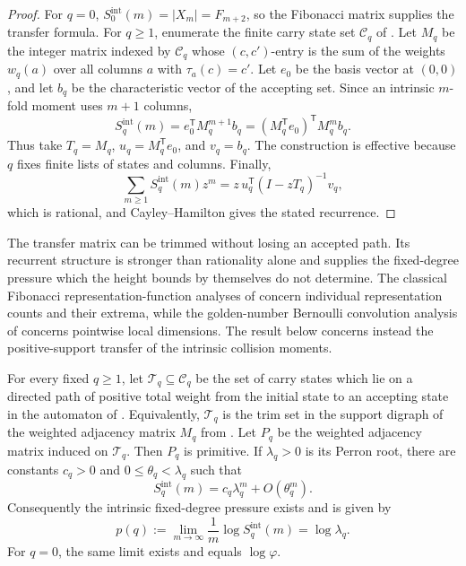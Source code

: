 \begin{proof}
For \(q=0\), \(S_0^{\mathrm{int}}(m)=|X_m|=F_{m+2}\), so the Fibonacci matrix
supplies the transfer formula.  For \(q\ge1\), enumerate the finite carry state
set \(\mathcal C_q\) of .  Let
\(M_q\) be the integer matrix indexed by \(\mathcal C_q\) whose \((c,c')\)-entry
is the sum of the weights \(w_q(a)\) over all columns \(a\) with
\(\tau_a(c)=c'\).  Let \(e_0\) be the basis vector at \((0,0)\), and let \(b_q\)
be the characteristic vector of the accepting set.  Since an intrinsic
\(m\)-fold moment uses \(m+1\) columns,
\[
  S_q^{\mathrm{int}}(m)=e_0^{\mathsf T}M_q^{m+1}b_q
  =(M_q^{\mathsf T}e_0)^{\mathsf T}M_q^m b_q .
\]
Thus take \(T_q=M_q\), \(u_q=M_q^{\mathsf T}e_0\), and \(v_q=b_q\).  The
construction is effective because \(q\) fixes finite lists of states and columns.
Finally,
\[
  \sum_{m\ge1}S_q^{\mathrm{int}}(m)z^m
  =z\,u_q^{\mathsf T}(I-zT_q)^{-1}v_q,
\]
which is rational, and Cayley--Hamilton gives the stated recurrence.
\end{proof}

The transfer matrix can be trimmed without losing an accepted path.  Its
recurrent structure is stronger than rationality alone and supplies the
fixed-degree pressure which the height bounds by themselves do not determine.
The classical Fibonacci representation-function analyses of
\cite{Carlitz1968,Carlitz1970,KocabovaMasakovaPelantova2005} concern individual
representation counts and their extrema, while the golden-number Bernoulli
convolution analysis of \cite{Hu1997} concerns pointwise local dimensions.  The
result below concerns instead the positive-support transfer of the intrinsic
collision moments.

\begin{theorem}
\label{thm:primitive-intrinsic-moment-transfer}
For every fixed \(q\ge1\), let \(\mathcal T_q\subseteq\mathcal C_q\) be the set
of carry states which lie on a directed path of positive total weight from the
initial state to an accepting state in the automaton of
.  Equivalently,
\(\mathcal T_q\) is the trim set in the support digraph of the weighted
adjacency matrix \(M_q\) from
.  Let \(P_q\) be the weighted
adjacency matrix induced on \(\mathcal T_q\).  Then \(P_q\) is
primitive.  If \(\lambda_q>0\) is its Perron root, there are constants
\(c_q>0\) and \(0\le\theta_q<\lambda_q\) such that
\[
  S_q^{\mathrm{int}}(m)
  =c_q\lambda_q^m+O(\theta_q^m).
\]
Consequently the intrinsic fixed-degree pressure exists and is given by
\[
  p(q):=\lim_{m\to\infty}\frac1m\log S_q^{\mathrm{int}}(m)
  =\log\lambda_q .
\]
For \(q=0\), the same limit exists and equals \(\log\varphi\).
\end{theorem}

